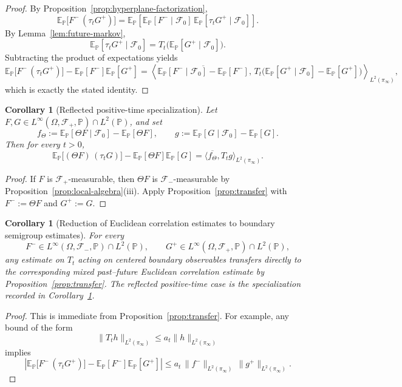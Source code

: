 \documentclass[11pt]{article}
\newtheorem{corollary}[theorem]{Corollary}
\theoremstyle{definition}
\theoremstyle{remark}
\newcommand{\E}{\mathbb E}
\newcommand{\mcF}{\mathcal F}
\begin{document}
\begin{proof}
By Proposition~\ref{prop:hyperplane-factorization},
\[
\E_{\mathbb P}\!\bigl[F^-\,(\tau_t G^+)\bigr]
=
\E_{\mathbb P}\!\left[
\E_{\mathbb P}[F^-\mid \mcF_0]\,
\E_{\mathbb P}[\tau_t G^+\mid \mcF_0]
\right].
\]
By Lemma~\ref{lem:future-markov},
\[
\E_{\mathbb P}[\tau_t G^+\mid \mcF_0]
=
T_t\!\bigl(\E_{\mathbb P}[G^+\mid \mcF_0]\bigr).
\]
Subtracting the product of expectations yields
\[
\E_{\mathbb P}\!\bigl[F^-\,(\tau_t G^+)\bigr]
-\E_{\mathbb P}[F^-]\E_{\mathbb P}[G^+]
=
\left\langle
\overline{\E_{\mathbb P}[F^-\mid\mcF_0]-\E_{\mathbb P}[F^-]},\,
T_t\!\bigl(\E_{\mathbb P}[G^+\mid\mcF_0]-\E_{\mathbb P}[G^+]\bigr)
\right\rangle_{L^2(\pi_\infty)},
\]
which is exactly the stated identity.
\end{proof}

\begin{corollary}[Reflected positive-time specialization]
\label{cor:reflected-transfer}
Let \(F,G\in L^\infty(\Omega,\mcF_+,\mathbb P)\cap L^2(\mathbb P)\), and set
\[
f_\Theta:=\E_{\mathbb P}[\Theta F\mid\mcF_0]-\E_{\mathbb P}[\Theta F],
\qquad
g:=\E_{\mathbb P}[G\mid\mcF_0]-\E_{\mathbb P}[G].
\]
Then for every \(t>0\),
\[
\E_{\mathbb P}\!\bigl[(\Theta F)\,(\tau_t G)\bigr]
-\E_{\mathbb P}[\Theta F]\E_{\mathbb P}[G]
=
\langle \overline{f_\Theta},T_t g\rangle_{L^2(\pi_\infty)}.
\]
\end{corollary}

\begin{proof}
If \(F\) is \(\mcF_+\)-measurable, then \(\Theta F\) is
\(\mcF_-\)-measurable by Proposition~\ref{prop:local-algebra}\textnormal{(iii)}.
Apply Proposition~\ref{prop:transfer} with \(F^-:=\Theta F\) and \(G^+:=G\).
\end{proof}

\begin{corollary}[Reduction of Euclidean correlation estimates to boundary semigroup estimates]
\label{cor:reduction}
For every
\[
F^-\in L^\infty(\Omega,\mcF_-,\mathbb P)\cap L^2(\mathbb P),
\qquad
G^+\in L^\infty(\Omega,\mcF_+,\mathbb P)\cap L^2(\mathbb P),
\]
any estimate on \(T_t\) acting on centered boundary observables transfers
directly to the corresponding mixed past--future Euclidean correlation estimate
by Proposition~\ref{prop:transfer}.  The reflected positive-time case is the
specialization recorded in Corollary~\ref{cor:reflected-transfer}.
\end{corollary}

\begin{proof}
This is immediate from Proposition~\ref{prop:transfer}.  For example, any
bound of the form
\[
\|T_t h\|_{L^2(\pi_\infty)}\le a_t\|h\|_{L^2(\pi_\infty)}
\]
implies
\[
\left|
\E_{\mathbb P}\!\bigl[F^-\,(\tau_t G^+)\bigr]
-\E_{\mathbb P}[F^-]\E_{\mathbb P}[G^+]
\right|
\le
a_t\,\|f^-\|_{L^2(\pi_\infty)}\,\|g^+\|_{L^2(\pi_\infty)}.
\]
\end{proof}
\end{document}
